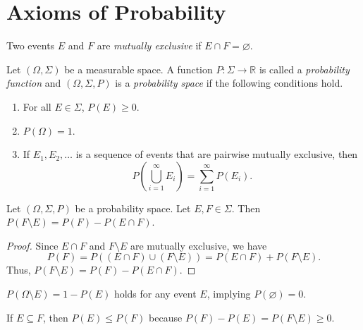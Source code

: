 \section{Axioms of Probability}
\begin{definition}
  Two events $E$ and $F$ are \emph{mutually exclusive} if
  $E \cap F = \varnothing$.
\end{definition}

\begin{definition}
  Let $(\Omega, \Sigma)$ be a measurable space.
  A function $P: \Sigma \to \mathbb{R}$ is called a
  \emph{probability function} and $(\Omega, \Sigma, P)$ is a
  \emph{probability space} if the following conditions hold.
  \begin{enumerate}
    \item For all $E \in \Sigma$, $P(E) \geq 0$.
    \item $P(\Omega) = 1$.
    \item If $E_1, E_2, \dots$ is a sequence of events that are pairwise
      mutually exclusive, then
      \begin{equation*}
        P\left(\bigcup_{i=1}^\infty E_i\right)
        = \sum_{i=1}^\infty P(E_i).
      \end{equation*}
  \end{enumerate}
\end{definition}

\begin{theorem}\label{thm:probability}
  Let $(\Omega, \Sigma, P)$ be a probability space.
  Let $E, F \in \Sigma$.
  Then $P(F \setminus E) = P(F) - P(E \cap F)$.
\end{theorem}
\begin{proof}
  Since $E \cap F$ and $F \setminus E$ are mutually exclusive, we have
  \begin{equation*}
    P(F)
    = P((E \cap F) \cup (F \setminus E))
    = P(E \cap F) + P(F \setminus E).
  \end{equation*}
  Thus, $P(F \setminus E) = P(F) - P(E \cap F)$.
\end{proof}

\begin{corollary}
  $P(\Omega \setminus E) = 1 - P(E)$ holds for any event $E$,
  implying $P(\varnothing) = 0$.
\end{corollary}

\begin{corollary}
  If $E \subseteq F$, then $P(E) \leq P(F)$
  because $P(F) - P(E) = P(F \setminus E) \geq 0$.
\end{corollary}

